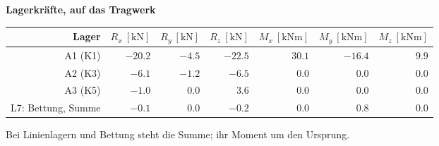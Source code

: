 \documentclass[11pt,a4paper]{article}
\begin{document}
\noindent\textbf{Lagerkräfte, auf das Tragwerk}
\begin{longtable}{rrrrrrr}
\hline
Lager & $R_x\ [\mathrm{kN}]$ & $R_y\ [\mathrm{kN}]$ & $R_z\ [\mathrm{kN}]$ & $M_x\ [\mathrm{kNm}]$ & $M_y\ [\mathrm{kNm}]$ & $M_z\ [\mathrm{kNm}]$ \\
\hline
\endhead
A1 (K1) & $-20.2$ & $-4.5$ & $-22.5$ & $30.1$ & $-16.4$ & $9.9$ \\
A2 (K3) & $-6.1$ & $-1.2$ & $-6.5$ & $0.0$ & $0.0$ & $0.0$ \\
A3 (K5) & $-1.0$ & $0.0$ & $3.6$ & $0.0$ & $0.0$ & $0.0$ \\
L7: Bettung, Summe & $-0.1$ & $0.0$ & $-0.2$ & $0.0$ & $0.8$ & $0.0$ \\
\hline
\end{longtable}
Bei Linienlagern und Bettung steht die Summe; ihr Moment um den Ursprung.
\end{document}
